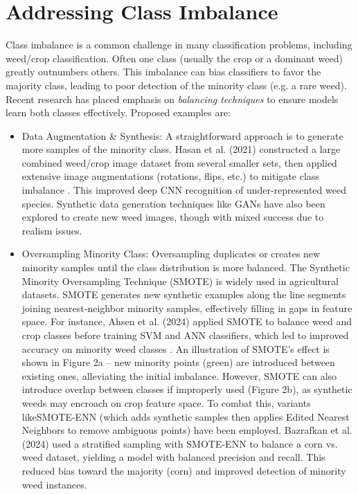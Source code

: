 \documentclass[letterpaper, notitlepage]{report}
\begin{document}
\section{Addressing Class Imbalance}  
Class imbalance is a common challenge in many classification problems, including weed/crop classification. Often one class (usually the crop or a dominant weed) greatly outnumbers others. This imbalance can bias classifiers to favor the majority class, leading to poor detection of the minority class (e.g. a rare weed). Recent research \parencite{Wang2021-dh} has placed emphasis on \textit{balancing techniques} to ensure models learn both classes effectively. Proposed examples are:  

\begin{itemize}
	\item{Data Augmentation \& Synthesis: A straightforward approach is to generate more samples of the minority class. Hasan et al. (2021) constructed a large combined weed/crop image dataset from several smaller sets, then applied extensive image augmentations (rotations, flips, etc.) to mitigate class imbalance \parencite{Mahmudul-Hasan2023-ap}. This improved deep CNN recognition of under-represented weed species. Synthetic data generation techniques like GANs have also been explored to create new weed images, though with mixed success due to realism issues. } 

	\item{Oversampling Minority Class: Oversampling duplicates or creates new minority samples until the class distribution is more balanced. The Synthetic Minority Oversampling Technique (SMOTE) is widely used  in agricultural datasets. SMOTE generates new synthetic examples along the line segments joining nearest-neighbor minority samples, effectively filling in gaps in feature space. For instance, Ahsen et al. (2024) applied SMOTE to balance weed and crop classes before training SVM and ANN classifiers, which led to improved accuracy on minority weed classes \parencite{Ahsen2024-dm}. An illustration of SMOTE’s effect is shown in Figure 2a – new minority points (green) are introduced between existing ones, alleviating the initial imbalance. However, SMOTE can also introduce overlap between classes if improperly used (Figure 2b), as synthetic weeds may encroach on crop feature space. To combat this, variants likeSMOTE-ENN (which adds synthetic samples then applies Edited Nearest Neighbors to remove ambiguous points) have been employed. Bazrafkan et al. (2024) used a stratified sampling with SMOTE-ENN to balance a corn vs. weed  dataset, yielding a model with balanced precision and recall. This reduced bias toward the majority (corn) and improved detection of minority weed instances.}


\end{itemize}
\end{document}
